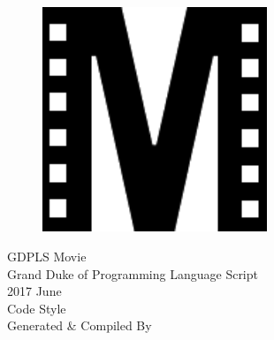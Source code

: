 \documentclass[a4paper]{article}
\begin{document}
  \thispagestyle{empty}
  \begin{center}
    \bfseries
    \nbvspace[2]
    \begin{figure}[H]
      \centering
      \includegraphics[width=0.6\textwidth]{../logo.pdf}
    \end{figure}
    {\Huge GDPLS Movie} \\[10pt]
    {\LARGE\akaDora Grand Duke of Programming Language Script}\\[10pt]
    {\Huge 2017 June} \\
    \nbvspace[1]
    \Huge Code Style\\
    \nbvspace[1]
    \normalsize Generated \& Compiled By \XeLaTeX
    \nbvspace[3]
  \end{center}
  \newpage

  
  
  
\end{document}
